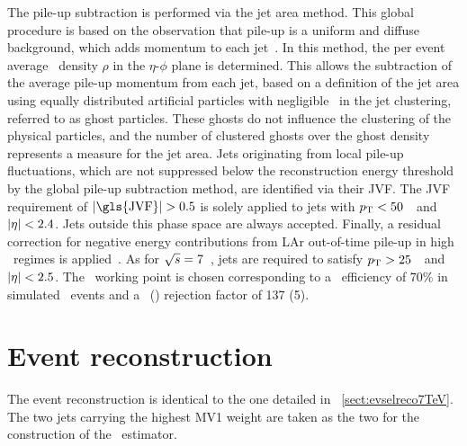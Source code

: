 %
The pile-up subtraction is performed via the jet area method. This global procedure is based on the observation that pile-up is a uniform and diffuse background, which adds momentum to each jet~\cite{ATLAS-CONF-2013-083}. In this method, the per event average \pt\ density $\rho$ in the $\eta$-$\phi$ plane is determined. This allows the subtraction of the average pile-up momentum from each jet, based on a definition of the jet area using equally distributed artificial particles with negligible \pt\ in the jet clustering, referred to as ghost particles. These ghosts do not influence the clustering of the physical particles, and the number of clustered ghosts over the ghost density represents a measure for the jet area. 
%
Jets originating from local pile-up fluctuations, which are not suppressed below the reconstruction energy threshold by the global pile-up subtraction method, are identified via their \gls{JVF}.
%
The \gls{JVF} requirement of $|\mathrm{\gls{JVF}}|>0.5$ is solely applied to jets with $p_\mathrm{T}<50$~\GeV\ and $|\eta|<2.4$. Jets outside this phase space are always accepted.
%
Finally, a residual correction for negative energy contributions from \gls{LAr} out-of-time pile-up in high \abseta\ regimes is applied~\cite{ATLAS-CONF-2013-083}.
%
As for ${\sqrt{s}}=7$~\TeV, jets are required to satisfy $p_\mathrm{T}>25$~\GeV\ and $|\eta|<2.5$.
%
The \btag\ working point is chosen corresponding to a \btag\ efficiency of 70\% in simulated \ttbar\ events and a \ljet\ (\cjet) rejection factor of 137 (5).
%










\section{Event reconstruction}
%
The event reconstruction is identical to the one detailed in \sect~\ref{sect:evselreco7TeV}. 
%
The two jets carrying the highest MV1 weight are taken as the two  for the construction of the \mlbr\ estimator. 






